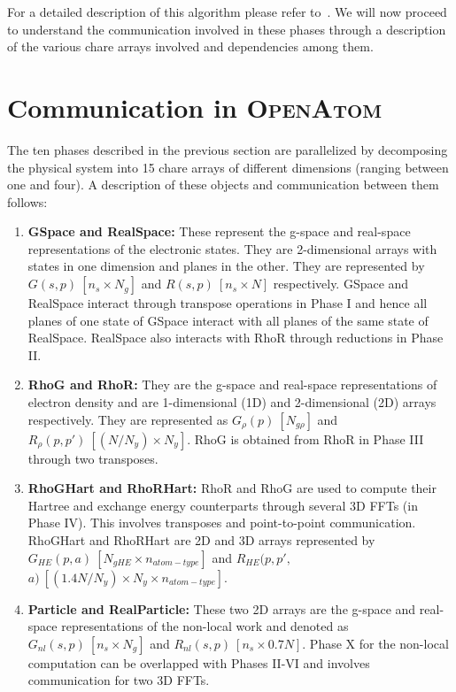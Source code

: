 \documentclass[12pt,letter]{article}
\newcommand{\leancp}{\textsc{OpenAtom}}
\begin{document}
For a detailed description of this algorithm please refer to~\cite{LeanCPIBM07}.
We will now proceed to understand the communication involved in these phases
through a description of the various chare arrays involved and dependencies
among them.

\section{Communication in \leancp{}}
The ten phases described in the previous section are parallelized by
decomposing the physical system into 15 chare arrays of different dimensions 
(ranging between one and four). A description of these objects and communication
between them follows:

\begin{enumerate}
\item {\bf GSpace and RealSpace:} These represent the g-space and real-space 
representations of the electronic states. They are 2-dimensional arrays 
with states in one dimension and planes in the other. They are represented by
$G(s, p)\ [n_s \times N_g]$ and $R(s, p)\ [n_s \times N]$ respectively. GSpace
and RealSpace interact through transpose operations in Phase I and hence all 
planes of one state of GSpace interact with all planes of the same state of 
RealSpace. RealSpace also interacts with RhoR through reductions in Phase II.

\item {\bf RhoG and RhoR:} They are the g-space and real-space representations of
electron density and are 1-dimensional (1D) and 2-dimensional (2D) arrays
respectively. They are represented as $G_{\rho}(p)\ [N_{g \rho}]$ and 
$R_{\rho}(p, p')\ [(N / N_y) \times N_y]$. RhoG is obtained from RhoR in Phase
III through two transposes.

\item {\bf RhoGHart and RhoRHart:} RhoR and RhoG are used to compute their 
Hartree and exchange energy counterparts through several 3D FFTs (in Phase IV). 
This involves transposes and point-to-point communication. RhoGHart and RhoRHart
are 2D and 3D arrays represented by $G_{HE}(p, a)\ [N_{gHE} \times 
n_{atom-type}]$ and $R_{HE}(p, p',$ $a)\ [(1.4N / N_y) \times N_y \times 
n_{atom-type}]$.

\item {\bf Particle and RealParticle:} These two 2D arrays are the g-space and
real-space representations of the non-local work and denoted as $G_{nl}(s, p)\
[n_s \times N_g]$ and $R_{nl}(s, p)\ [n_s \times 0.7N]$. Phase X for the
non-local computation can be overlapped with Phases II-VI and involves
communication for two 3D FFTs.


\end{enumerate}
\end{document}
